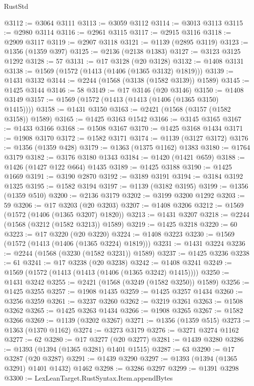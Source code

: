 \begin{lexlean}{RustStd}
\begin{coremodule}
@3112 := @3064 @3111
@3113 := @3059 @3112
@3114 := @3013 @3113
@3115 := @2980 @3114
@3116 := @2961 @3115
@3117 := @2915 @3116
@3118 := @2909 @3117
@3119 := @2907 @3118
@3121 := @1139 (@2895 @3119)
@3123 := @1356 (@1359 @397)
@3125 := @2136 (@2138 @1383)
@3127 := @3123 @3125 @1292
@3128 := 57
@3131 := @17 @3128 (@20 @3128)
@3132 := @1408 @3131
@3138 := @1569 (@1572 (@1413 (@1406 (@1365 @3132) @1819)))
@3139 := @1431 @3132
@3144 := @2244 (@1568 (@3138 (@1582 @3139)) @1589)
@3145 := @1425 @3144
@3146 := 58
@3149 := @17 @3146 (@20 @3146)
@3150 := @1408 @3149
@3157 := @1569 (@1572 (@1413 (@1413 (@1406 (@1365 @3150) @1415))))
@3158 := @1431 @3150
@3163 := @2421 (@1568 (@3157 (@1582 @3158)) @1589)
@3165 := @1425 @3163 @1542
@3166 := @3145 @3165
@3167 := @1433 @3166
@3168 := @1508 @3167
@3170 := @1425 @3168 @1434
@3171 := @1908 @3170
@3172 := @1582 @3171
@3174 := @1139 (@3127 @3172)
@3176 := @1356 (@1359 @428)
@3179 := @1363 (@1375 @1162) @1383
@3180 := @1764 @3179
@3182 := @3176 @3180 @1343
@3184 := @1420 (@1421 @659)
@3188 := @1426 (@1427 @122 @664) @1435
@3189 := @1425 @3188
@3190 := @1425 @1669
@3191 := @3190 @2870
@3192 := @3189 @3191
@3194 := @3184 @3192 @1325
@3195 := @1582 @3194
@3197 := @1139 (@3182 @3195)
@3199 := @1356 (@1359 @510)
@3200 := @2136 @3179
@3202 := @3199 @3200 @1292
@3203 := 59
@3206 := @17 @3203 (@20 @3203)
@3207 := @1408 @3206
@3212 := @1569 (@1572 (@1406 (@1365 @3207) @1820))
@3213 := @1431 @3207
@3218 := @2244 (@1568 (@3212 (@1582 @3213)) @1589)
@3219 := @1425 @3218
@3220 := 60
@3223 := @17 @3220 (@20 @3220)
@3224 := @1408 @3223
@3230 := @1569 (@1572 (@1413 (@1406 (@1365 @3224) @1819)))
@3231 := @1431 @3224
@3236 := @2244 (@1568 (@3230 (@1582 @3231)) @1589)
@3237 := @1425 @3236
@3238 := 61
@3241 := @17 @3238 (@20 @3238)
@3242 := @1408 @3241
@3249 := @1569 (@1572 (@1413 (@1413 (@1406 (@1365 @3242) @1415))))
@3250 := @1431 @3242
@3255 := @2421 (@1568 (@3249 (@1582 @3250)) @1589)
@3256 := @1425 @3255
@3257 := @1908 @1435
@3259 := @1425 @3257 @1434
@3260 := @3256 @3259
@3261 := @3237 @3260
@3262 := @3219 @3261
@3263 := @1508 @3262
@3265 := @1425 @3263 @1434
@3266 := @1908 @3265
@3267 := @1582 @3266
@3269 := @1139 (@3202 @3267)
@3271 := @1356 (@1359 @515)
@3273 := @1363 (@1370 @1162)
@3274 := @3273 @3179
@3276 := @3271 @3274 @1162
@3277 := 62
@3280 := @17 @3277 (@20 @3277)
@3281 := @1439 @3280
@3286 := @1393 (@1394 (@1365 @3281) @1401 @1515)
@3287 := 63
@3290 := @17 @3287 (@20 @3287)
@3291 := @1439 @3290
@3297 := @1393 (@1394 (@1365 @3291) @1401 @1432) @1462
@3298 := @3286 @3297
@3299 := @1391 @3298
@3300 := LexLeanTarget.RustSyntax.Item.appendBytes

\end{coremodule}
\end{lexlean}
